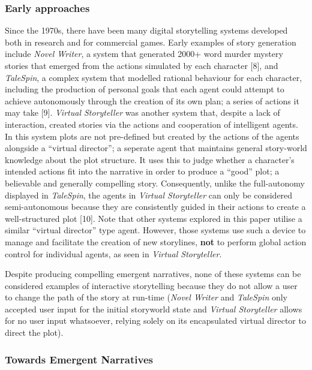 \documentclass{sig-alternate-05-2015}
\begin{document}
\subsubsection{Early approaches}
Since the 1970s, there have been many digital storytelling systems developed both in research and for commercial games. Early examples of story generation include \textit{Novel Writer}, a system that generated 2000+ word murder mystery stories that emerged from the actions simulated by each character [8], and \textit{TaleSpin}, a complex system that modelled rational behaviour for each character, including the production of personal goals that each agent could attempt to achieve autonomously through the creation of its own plan; a series of actions it may take [9]. \textit{Virtual Storyteller} was another system that, despite a lack of interaction, created stories via the actions and cooperation of intelligent agents. In this system plots are not pre-defined but created by the actions of the agents alongside a ``virtual director''; a seperate agent that maintains general story-world knowledge about the plot structure. It uses this to judge whether a character's intended actions fit into the narrative in order to produce a ``good'' plot; a believable and generally compelling story. Consequently, unlike the full-autonomy displayed in \textit{TaleSpin}, the agents in \textit{Virtual Storyteller} can only be considered semi-autonomous because they are consistently guided in their actions to create a well-structured plot [10]. Note that other systems explored in this paper utilise a similar ``virtual director'' type agent. However, those systems use such a device to manage and facilitate the creation of new storylines, \textbf{not} to perform global action control for individual agents, as seen in \textit{Virtual Storyteller}.

Despite producing compelling emergent narratives, none of these systems can be considered examples of interactive storytelling because they do not allow a user to change the path of the story at run-time (\textit{Novel Writer} and \textit{TaleSpin} only accepted user input for the initial storyworld state and \textit{Virtual Storyteller} allows for no user input whatsoever, relying solely on its encapsulated virtual director to direct the plot).\\

\subsubsection{Towards Emergent Narratives}
\end{document}
